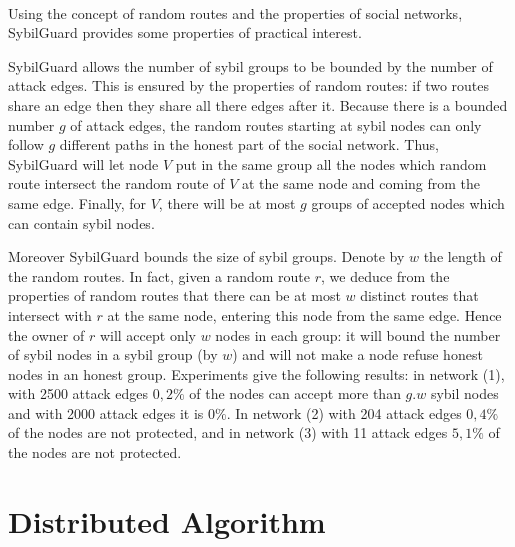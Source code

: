 \documentclass[a4paper,11pt]{article}
\begin{document}
\paragraph{}
Using the concept of random routes and the properties of social networks, SybilGuard provides some properties of practical interest.

SybilGuard allows the number of sybil groups to be bounded by the number of attack edges.
This is ensured by the properties of random routes: if two routes share an edge then they share all there edges after it.
Because there is a bounded number $g$ of attack edges, the random routes starting at sybil nodes can only follow $g$ different paths in the honest part of the social network.
Thus, SybilGuard will let node $V$ put in the same group all the nodes which random route intersect the random route of $V$ at the same node and coming from the same edge.
Finally, for $V$, there will be at most $g$ groups of accepted nodes which can contain sybil nodes. 

Moreover SybilGuard bounds the size of sybil groups.
Denote by $w$ the length of the random routes.
In fact, given a random route $r$, we deduce from the properties of random routes that there can be at most $w$ distinct routes that intersect with $r$ at the same node, entering this node from the same edge.
Hence the owner of $r$ will accept only $w$ nodes in each group: it will bound the number of sybil nodes in a sybil group (by $w$) and will not make a node refuse honest nodes in an honest group.
Experiments give the following results: in network (1), with 2500 attack edges $0,2\%$ of the nodes can accept more than $g.w$ sybil nodes and with 2000 attack edges it is $0\%$.
In network (2) with 204 attack edges $0,4\%$ of the nodes are not protected, and in network (3) with 11 attack edges $5,1\%$ of the nodes are not protected.

 

\section{Distributed Algorithm}



\end{document}
